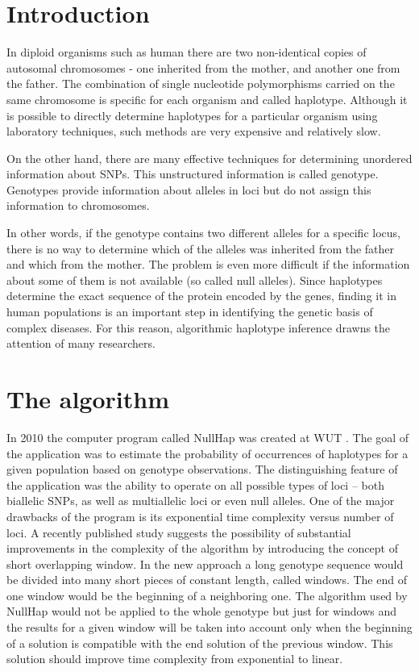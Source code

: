 \documentclass{llncs}
\begin{document}
\section{Introduction}
In diploid organisms such as human there are two non-identical copies of autosomal chromosomes - one inherited from the mother, and another one from the father. 
The combination of single nucleotide polymorphisms carried on the same chromosome is specific for each organism and called haplotype. 
Although it is possible to directly determine haplotypes for a particular organism using laboratory techniques, such methods are very expensive and relatively slow. 


On the other hand, there are many effective techniques for determining unordered information about SNPs. 
This unstructured information is called genotype. 
Genotypes provide information about alleles in loci but do not assign this information to chromosomes. 


In other words, if the genotype contains two different alleles for a specific locus, there is no way to determine which of the alleles was inherited from the father and which from the mother. 
The problem is even more difficult if the information about some of them is not available (so called null alleles). 
Since haplotypes determine the exact sequence of the protein encoded by the genes, finding it in human populations is an important step in identifying the genetic basis of complex diseases. 
For this reason, algorithmic haplotype inference drawns the attention of many researchers.

\section{The algorithm}

In 2010 the computer program called NullHap was created at WUT \cite{nowak}.
The goal of the application was to estimate the probability of occurrences of haplotypes for a given population based on genotype observations. 
The distinguishing feature of the application was the ability to operate on all possible types of loci -- both biallelic SNPs, as well as multiallelic loci or even null alleles.
One of the major drawbacks of the program is its exponential time complexity versus number of loci.
A recently published study \cite{gusev} suggests the possibility of substantial improvements in the complexity of the algorithm by introducing the concept of short overlapping window.
In the new approach a long genotype sequence would be divided into many short pieces of constant length, called windows.
The end of one window would be the beginning of a neighboring one.
The algorithm used by NullHap would not be applied to the whole genotype but just for windows and the results for a given window will be taken into account only when the beginning of a solution is compatible with the end solution of the previous window.
This solution should improve time complexity from exponential to linear.
\end{document}
